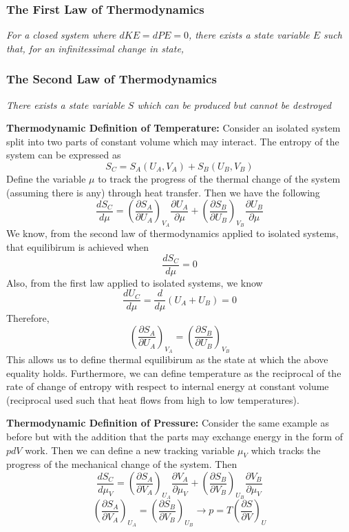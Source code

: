 \documentclass[11pt]{article}
\newcommand{\CenteredBoxed}[1]{\begin{center}\boxed{#1}\end{center}}
\newcommand{\Partial}[2]{\frac{\partial #1}{\partial #2}}
\newcommand{\PartialConst}[3]{\left(\Partial{#1}{#2}\right)_{#3}}
\begin{document}
\subsubsection{The First Law of Thermodynamics}
\large\emph{For a closed system where $dKE=dPE=0$, there exists a state variable $E$ such that, for an infinitessimal change in state,}
\CenteredBoxed{dE=\delta Q + \delta W}
\normalsize

\subsubsection{The Second Law of Thermodynamics}
\large\emph{There exists a state variable $S$ which can be produced but cannot be destroyed}
\CenteredBoxed{S_2-S_1=\Delta S \geq 0}
\normalsize

\textbf{Thermodynamic Definition of Temperature:}
Consider an isolated system split into two parts of constant volume which may interact. The entropy of the system can be expressed as 
$$S_C=S_A(U_A,V_A) + S_B(U_B,V_B)$$
Define the variable $\mu$ to track the progress of the thermal change of the system (assuming there is any) through heat transfer. Then we have the following
$$\frac{dS_C}{d\mu}=\PartialConst{S_A}{U_A}{V_A}\Partial{U_A}{\mu} + \PartialConst{S_B}{U_B}{V_B}\Partial{U_B}{\mu}$$
We know, from the second law of thermodynamics applied to isolated systems, that equilibirum is achieved when
$$\frac{dS_C}{d\mu}=0$$
Also, from the first law applied to isolated systems, we know
$$\frac{dU_C}{d\mu}=\frac{d}{d\mu}(U_A+U_B)=0$$
Therefore,
$$\PartialConst{S_A}{U_A}{V_A}=\PartialConst{S_B}{U_B}{V_B}$$
This allows us to define thermal equilibirum as the state at which the above equality holds. Furthermore, we can define temperature as the reciprocal of the rate of change of entropy with respect to internal energy at constant volume (reciprocal used such that heat flows from high to low temperatures).
\CenteredBoxed{T=\frac{1}{\left(\partial S/\partial U\right)_{V}}}

\textbf{Thermodynamic Definition of Pressure:}
Consider the same example as before but with the addition that the parts may exchange energy in the form of $pdV$ work.  Then we can define a new tracking variable $\mu_V$ which tracks the progress of the mechanical change of the system. Then
$$\frac{dS_C}{d\mu_V}=\PartialConst{S_A}{V_A}{U_A}\Partial{V_A}{\mu_V} + \PartialConst{S_B}{V_B}{U_B}\Partial{V_B}{\mu_V}$$
$$\PartialConst{S_A}{V_A}{U_A}=\PartialConst{S_B}{V_B}{U_B}\to p = T\PartialConst{S}{V}{U}$$
\end{document}

